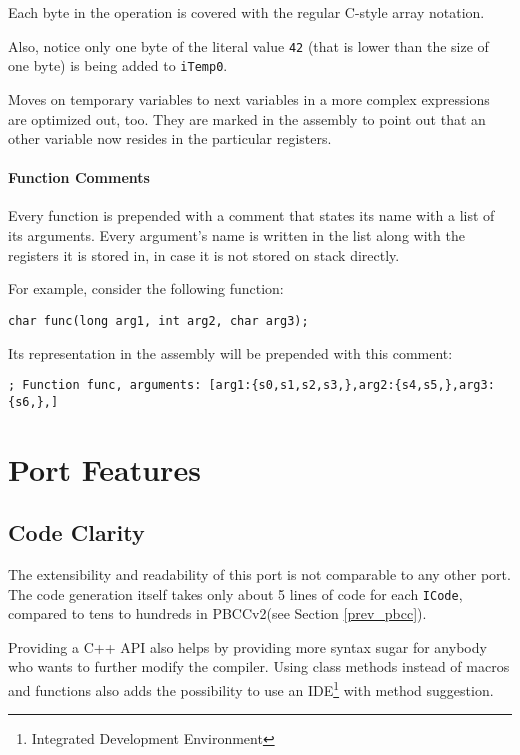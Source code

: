             Each byte in the operation is covered with the regular C-style array notation.

            Also, notice only one byte of the literal value \texttt{42} (that is lower than the size of one byte) is being added to \texttt{iTemp0}. 

            Moves on temporary variables to next variables in a more complex expressions are optimized out, too. They are marked in the assembly to point out that an other variable now resides in the particular registers.

            \subsubsection{Function Comments}

            Every function is prepended with a comment that states its name with a list of its arguments. Every argument's name is written in the list along with the registers it is stored in, in case it is not stored on stack directly.

            For example, consider the following function:

            \begin{center}\texttt{char func(long arg1, int arg2, char arg3);}\end{center}

            Its representation in the assembly will be prepended with this comment:

            \begin{center}\texttt{; Function func, arguments: [arg1:\{s0,s1,s2,s3,\},arg2:\{s4,s5,\},arg3:\{s6,\},]}\end{center}

\chapter{Port Features}\label{features}

    \section{Code Clarity}

    The extensibility and readability of this port is not comparable to any other port. The code generation itself takes only about 5 lines of code for each \texttt{ICode}, compared to tens to hundreds in PBCCv2(see Section \ref{prev_pbcc}).

    Providing a C++ API also helps by providing more syntax sugar for anybody who wants to further modify the compiler. Using class methods instead of macros and functions also adds the possibility to use an IDE\footnote{Integrated Development Environment} with method suggestion.

